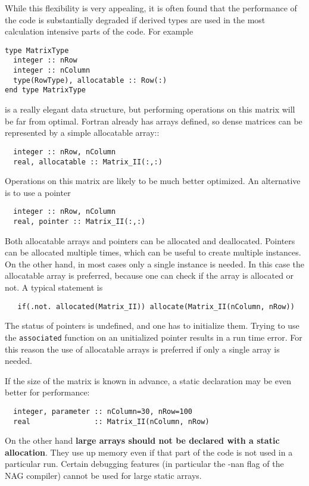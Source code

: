 \documentclass{article}
\begin{document}
While this flexibility is very appealing, it is often found that 
the performance of the code is substantially degraded if derived types
are used in the most calculation intensive parts of the code.
For example
\begin{verbatim}
type MatrixType
  integer :: nRow
  integer :: nColumn
  type(RowType), allocatable :: Row(:)
end type MatrixType
\end{verbatim}
is a really elegant data structure, but performing operations on this
matrix will be far from optimal. Fortran already has arrays defined,
so dense matrices can be represented by a simple allocatable array::
\begin{verbatim}
  integer :: nRow, nColumn
  real, allocatable :: Matrix_II(:,:)
\end{verbatim}
Operations on this matrix are likely to be much better optimized. 
An alternative is to use a pointer
\begin{verbatim}
  integer :: nRow, nColumn
  real, pointer :: Matrix_II(:,:)
\end{verbatim}
Both allocatable arrays and pointers can be allocated and deallocated.
Pointers can be allocated multiple times, which can be useful to create
multiple instances. On the other hand, in most cases only a single
instance is needed. In this case the allocatable array is preferred,
because one can check if the array is allocated or not. A typical
statement is
\begin{verbatim}
   if(.not. allocated(Matrix_II)) allocate(Matrix_II(nColumn, nRow))
\end{verbatim}
The status of pointers is undefined, and one has to initialize them.
Trying to use the {\tt associated} function on an unitialized pointer
results in a run time error. For this reason the use of allocatable
arrays is preferred if only a single array is needed.

If the size of the matrix is known in advance, a static declaration
may be even better for performance:
\begin{verbatim}
  integer, parameter :: nColumn=30, nRow=100
  real               :: Matrix_II(nColumn, nRow)
\end{verbatim}
On the other hand {\bf large arrays should not be declared with a static 
allocation}. They use up memory even if that part of the code is not
used in a particular run. Certain debugging features (in particular
the -nan flag of the NAG compiler) cannot be used for large static arrays.
\end{document}
